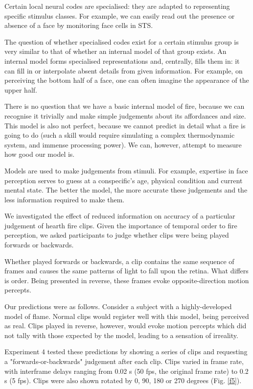 \documentclass[a4paper]{article}
\begin{document}
Certain local neural codes are specialised: they are adapted to representing specific stimulus classes. For example, we can easily read out the presence or absence of a face by monitoring face cells in STS\cite{tsao2008patches}.

The question of whether specialised codes exist for a certain stimulus group is very similar to that of whether an internal model of that group exists. An internal model forms specialised representations and, centrally, fills them in: it can fill in or interpolate absent details from given information. For example, on perceiving the bottom half of a face, one can often imagine the appearance of the upper half.

There is no question that we have a basic internal model of fire, because we can recognise it trivially and make simple judgements about its affordances and size. This model is also not perfect, because we cannot predict in detail what a fire is going to do (such a skill would require simulating a complex thermodynamic system, and immense processing power). We can, however, attempt to measure how good our model is.

Models are used to make judgements from stimuli. For example, expertise in face perception serves to guess at a conspecific's age, physical condition and current mental state. The better the model, the more accurate these judgements and the less information required to make them.

 We investigated the effect of reduced information on accuracy of a particular judgement of hearth fire clips. Given the importance of temporal order to fire perception, we asked participants to judge whether clips were being played forwards or backwards.

Whether played forwards or backwards, a clip contains the same sequence of frames and causes the same patterns of light to fall upon the retina. What differs is order. Being presented in reverse, these frames evoke opposite-direction motion percepts.

Our predictions were as follows. Consider a subject with a highly-developed model of flame. Normal clips would register well with this model, being perceived as real. Clips played in reverse, however, would evoke motion percepts which did not tally with those expected by the model, leading to a sensation of irreality.

Experiment 4 tested these predictions by showing a series of clips and requesting a "forwards-or-backwards" judgement after each clip. Clips varied in frame rate, with interframe delays ranging from 0.02 s (50 fps, the original frame rate) to 0.2 s (5 fps). Clips were also shown rotated by 0, 90, 180 or 270 degrees (Fig. \ref{f5}). 
\end{document}
